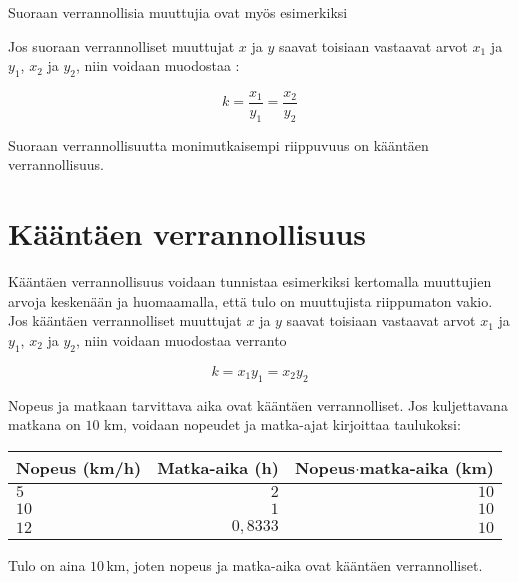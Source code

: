 Suoraan verrannollisia muuttujia ovat myös esimerkiksi

Jos suoraan verrannolliset muuttujat $x$ ja $y$ saavat toisiaan vastaavat arvot $x_1$ ja $y_1$, $x_2$ ja $y_2$, niin voidaan muodostaa :

$$ k = \frac{x_1}{y_1} = \frac{x_2}{y_2}$$

%
%
%

Suoraan verrannollisuutta monimutkaisempi riippuvuus on kääntäen verrannollisuus.


\section*{Kääntäen verrannollisuus}

Kääntäen verrannollisuus voidaan tunnistaa esimerkiksi kertomalla muuttujien arvoja keskenään ja huomaamalla, että tulo on muuttujista riippumaton vakio. Jos kääntäen verrannolliset muuttujat $x$ ja $y$ saavat toisiaan vastaavat arvot $x_1$ ja $y_1$, $x_2$ ja $y_2$, niin voidaan muodostaa verranto

$$ k = x_1y_1 = x_2y_2$$

\begin{esimerkki}
	Nopeus ja matkaan tarvittava aika ovat kääntäen verrannolliset. Jos kuljettavana matkana on $10$ km, voidaan nopeudet ja matka-ajat kirjoittaa taulukoksi:
	\begin{center} 
		\begin{tabular}{|l|r|r|}
			\hline
			Nopeus (km/h) & Matka-aika (h) & Nopeus$\cdot$matka-aika (km) \\
			\hline
			$5$ & $2$ & $10$ \\
			$10$ & $1$ & $10$ \\
			$12$ & $0,8333$ & $10$ \\
			\hline
		\end{tabular}
	\end{center}
	Tulo on aina $10$\,km, joten nopeus ja matka-aika ovat kääntäen verrannolliset.
\end{esimerkki}


